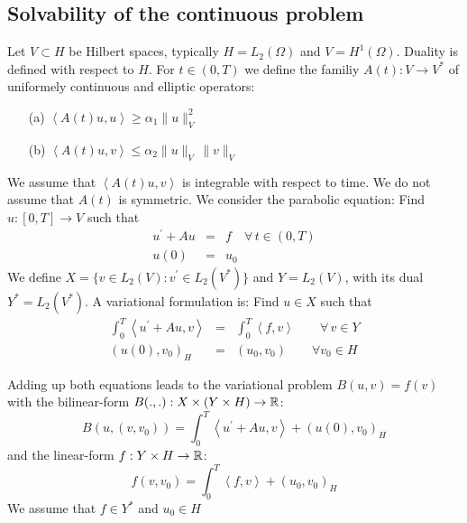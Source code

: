 \subsection{Solvability of the continuous problem}
%
Let $V \subset H$ be Hilbert spaces, typically $H = L_2(\Omega)$ and $V = H^1(\Omega)$. Duality is defined with respect to $H$.
For $t \in (0,T)$ we define the familiy $A(t) : V \rightarrow V^\ast$ of uniformely continuous and elliptic operators:
\begin{enumerate}
\item[(a)] $\left< A(t) u, u \right> \geq \alpha_1 \| u \|_V^2 $
\item[(b)] $\left< A(t) u, v \right> \leq \alpha_2 \| u \|_V  \, \| v \|_V$ 
\end{enumerate}
We assume that $\left< A(t) u, v \right>$ is integrable with respect to time. We do not assume that $A(t)$ is symmetric.
We consider the parabolic equation: Find $u : [0,T] \rightarrow V$ such that
\begin{eqnarray*}
u^\prime + A u & = & f  \quad \forall \, t \in (0,T) \\
u(0) & = & u_0
\end{eqnarray*}
We define $X = \{ v \in L_2(V) : v^\prime \in L_2(V^\ast) \} $ and $Y = L_2(V)$, with its dual $Y^\ast = L_2(V^\ast)$.
A variational formulation is: Find $u \in X$ such that
\begin{eqnarray} 
\label{equ_parabolic1}
\int_0^T \left< u^\prime + A u, v \right> & = & \int_0^T \left< f, v \right>   \qquad \forall \, v \in Y \\
\label{equ_parabolic2}
(u(0), v_0)_H & = & (u_0, v_0) \qquad \forall v_0 \in H
\end{eqnarray}

Adding up both equations leads to the variational problem $B(u,v) = f(v)$ with the bilinear-form
$B(.,.) : X \times (Y \times H) \rightarrow {\mathbb R}$:
$$
B(u, (v,v_0)) = \int_0^T \left< u^\prime + A u, v \right> + (u(0), v_0)_H
$$
and the linear-form $f : Y \times H \rightarrow {\mathbb R}$:
$$
f(v,v_0) = \int_0^T \left< f, v \right> + (u_0, v_0)_H
$$ 
We assume that $f \in Y^\ast$ and $u_0 \in H$

